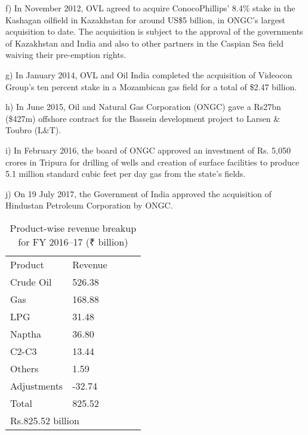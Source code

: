 f) In November 2012, OVL agreed to acquire ConocoPhillips' 8.4\% stake in the Kashagan oilfield in Kazakhstan for around US\$5 billion, in ONGC's largest acquisition to date. The acquisition is subject to the approval of the governments of Kazakhstan and India and also to other partners in the Caspian Sea field waiving their pre-emption rights.

g) In January 2014, OVL and Oil India completed the acquisition of Videocon Group's ten percent stake in a Mozambican gas field for a total of \$2.47 billion.

h) In June 2015, Oil and Natural Gas Corporation (ONGC) gave a Rs27bn (\$427m) offshore contract for the Bassein development project to Larsen \& Toubro (L\&T).

i) In February 2016, the board of ONGC approved an investment of Rs. 5,050 crores in Tripura for drilling of wells and creation of surface facilities to produce 5.1 million standard cubic feet per day gas from the state's fields.

j) On 19 July 2017, the Government of India approved the acquisition of Hindustan Petroleum Corporation by ONGC.

 
 
\begin{table}[]
\begin{tabular}{|l|l|lll}
\cline{1-2}
Product              & Revenue          &  &  &  \\ \cline{1-2}
Crude Oil            & 526.38           &  &  &  \\ \cline{1-2}
Gas                  & 168.88           &  &  &  \\ \cline{1-2}
LPG                  & 31.48            &  &  &  \\ \cline{1-2}
Naptha               & 36.80            &  &  &  \\ \cline{1-2}
C2-C3                & 13.44            &  &  &  \\ \cline{1-2}
Others               & 1.59             &  &  &  \\ \cline{1-2}
Adjustments          & -32.74           &  &  &  \\ \cline{1-2}
Total                & 825.52           &  &  &  \\ \cline{1-2}
\multicolumn{2}{|l|}{Rs.825.52 billion} &  &  &  \\ \cline{1-2}
\end{tabular}

\caption{Product-wise revenue breakup for FY 2016–17 (₹ billion)}
\end{table}


